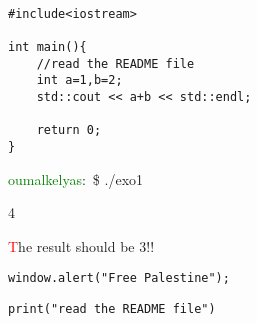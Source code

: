 






\begin{exambox}[title=Exercice 1 : Polymorphisme]
    \begin{verbatim}

#include<iostream>

int main(){
    //read the README file
    int a=1,b=2;
    std::cout << a+b << std::endl;

    return 0;
}
    \end{verbatim}
\end{exambox}

\begin{terminalbox}
\textcolor{green}{oumalkelyas}:~\$ ./exo1

4
\end{terminalbox}

\begin{commentbox}
    \textcolor{red}{T}he result should be 3!!
\end{commentbox}


\begin{techbox}[title=Exercice 1 : DOM]
    \begin{verbatim}
window.alert("Free Palestine");
    \end{verbatim}
\end{techbox}

\begin{glassbox}[title=Exercice 2 : Polymorphisme]
    \begin{verbatim}
print("read the README file")
    \end{verbatim}
\end{glassbox}


